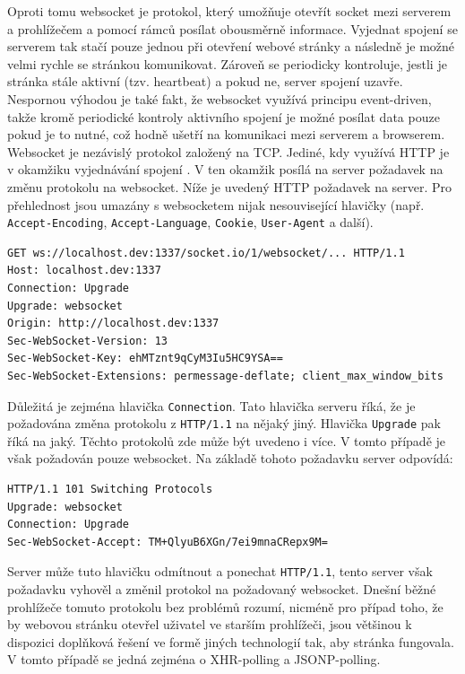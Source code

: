 Oproti tomu websocket \cite{rfc6455} je protokol, který umožňuje otevřít socket mezi serverem a prohlížečem a pomocí rámců posílat obousměrně informace. Vyjednat spojení se serverem tak stačí pouze jednou při otevření webové stránky a následně je možné velmi rychle se stránkou komunikovat. Zároveň se periodicky kontroluje, jestli je stránka stále aktivní (tzv. heartbeat) a pokud ne, server spojení uzavře. Nespornou výhodou je také fakt, že websocket využívá principu event-driven, takže kromě periodické kontroly aktivního spojení je možné posílat data pouze pokud je to nutné, což hodně ušetří na komunikaci mezi serverem a browserem. Websocket  je nezávislý protokol založený na TCP. Jediné, kdy využívá HTTP je v okamžiku vyjednávání spojení \cite{rfc6455}. V ten okamžik posílá na server požadavek na změnu protokolu na websocket. Níže je uvedený HTTP požadavek na server. Pro přehlednost jsou umazány s websocketem nijak nesouvisející hlavičky (např. \texttt{Accept-Encoding}, \texttt{Accept-Language}, \texttt{Cookie}, \texttt{User-Agent} a další).

\begin{verbatim}
GET ws://localhost.dev:1337/socket.io/1/websocket/... HTTP/1.1
Host: localhost.dev:1337
Connection: Upgrade
Upgrade: websocket
Origin: http://localhost.dev:1337
Sec-WebSocket-Version: 13
Sec-WebSocket-Key: ehMTznt9qCyM3Iu5HC9YSA==
Sec-WebSocket-Extensions: permessage-deflate; client_max_window_bits
\end{verbatim}

Důležitá je zejména hlavička \texttt{Connection}. Tato hlavička serveru říká, že je požadována změna protokolu z \texttt{HTTP/1.1} na nějaký jiný. Hlavička \texttt{Upgrade} pak říká na jaký. Těchto protokolů zde může být uvedeno i více. V tomto případě je však požadován pouze websocket. Na základě tohoto požadavku server odpovídá:

\begin{verbatim}
HTTP/1.1 101 Switching Protocols
Upgrade: websocket
Connection: Upgrade
Sec-WebSocket-Accept: TM+QlyuB6XGn/7ei9mnaCRepx9M=
\end{verbatim}

Server může tuto hlavičku odmítnout a ponechat \texttt{HTTP/1.1}, tento server však požadavku vyhověl a změnil protokol na požadovaný websocket. Dnešní běžné prohlížeče tomuto protokolu bez problémů rozumí, nicméně pro případ toho, že by webovou stránku otevřel uživatel ve starším prohlížeči, jsou většinou k dispozici doplňková řešení ve formě jiných technologií tak, aby stránka fungovala. V tomto případě se jedná zejména o XHR-polling a JSONP-polling.

